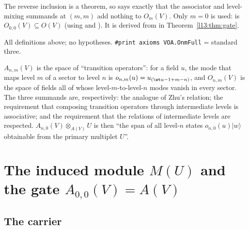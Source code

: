 \begin{dictionary}
The reverse inclusion  is a theorem, so  says exactly that the associator and
level-mixing summands at $(m,m)$ add nothing to $O_m(V)$. Only $m = 0$ is used:  is $O_{0,0}(V)\subseteq O(V)$
(using  and ). It is derived from  in Theorem~\ref{l13:thm:gate}.
\end{dictionary}

\begin{status}
All definitions above; no hypotheses. \texttt{\#print axioms VOA.OnmFull} = standard three.
\end{status}

\begin{physics}
$A_{n,m}(V)$ is the space of ``transition operators'': for a field $u$, the mode that maps level $m$ of a sector to level $n$
is $o_{n,m}(u) = u_{(\wt u-1+m-n)}$, and $O_{n,m}(V)$ is the space of fields all of whose level-$m$-to-level-$n$ modes vanish in
every sector. The three summands are, respectively: the analogue of Zhu's relation; the requirement that composing transition
operators through intermediate levels is associative; and the requirement that the relations of intermediate levels are
respected. $A_{n,0}(V)\otimes_{A(V)}U$ is then ``the span of all level-$n$ states $o_{n,0}(u)|w\rangle$ obtainable from the
primary multiplet $U$''.
\end{physics}

\section{The induced module \texorpdfstring{$M(U)$}{M(U)} and the gate \texorpdfstring{$A_{0,0}(V) = A(V)$}{A\_\{0,0\}(V)=A(V)}}\label{l13:sec:MU}

\subsection{The carrier}

